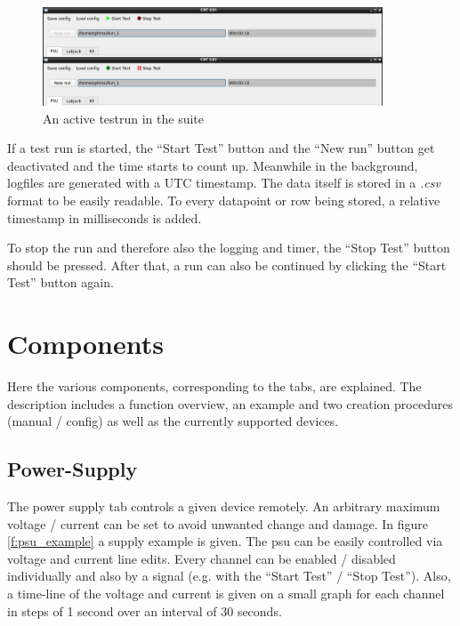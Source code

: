 \documentclass[10pt,a4paper]{article}
\begin{document}
	\begin{figure}[H]
\centering
\includegraphics[width=0.9\textwidth]{./4_Testrun.png}
\caption{An active testrun in the suite}
	\end{figure}
	
	If a test run is started, the \enquote{Start Test} button and the \enquote{New run} button get deactivated and the time starts to count up. Meanwhile in the background, logfiles are generated with a UTC timestamp. The data itself is stored in a \textit{.csv} format to be easily readable. To every datapoint or row being stored, a relative timestamp in milliseconds is added.
	
	\bigbreak
	
	To stop the run and therefore also the logging and timer, the \enquote{Stop Test} button should be pressed. After that, a run can also be continued by clicking the \enquote{Start Test} button again.	
	
\newpage
	
\section{Components}
Here the various components, corresponding to the tabs, are explained. The description includes a function overview, an example and two creation procedures (manual / config) as well as the currently supported devices.

	\subsection{Power-Supply}
	The power supply tab controls a given device remotely. An arbitrary maximum voltage / current can be set to avoid unwanted change and damage. In figure \eqref{f:psu_example} a supply example is given. The psu can be easily controlled via voltage and current line edits. Every channel can be enabled / disabled individually and also by a signal (e.g. with the \enquote{Start Test} / \enquote{Stop Test}). Also, a time-line of the voltage and current is given on a small graph for each channel in steps of 1 second over an interval of 30 seconds. 	
	
\end{document}

